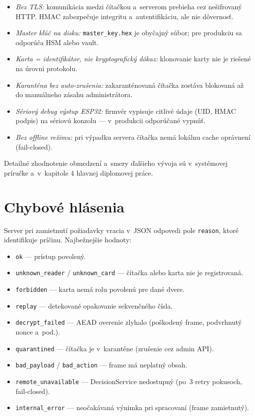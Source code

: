 \documentclass[a4paper]{feidippp}
\begin{document}
\begin{itemize}
\item \emph{Bez TLS:} komunikácia medzi čítačkou a~serverom prebieha cez nešifrovaný HTTP. HMAC zabezpečuje integritu a~autentifikáciu, ale nie dôvernosť.
\item \emph{Master kľúč na disku:} \texttt{master\_key.hex} je obyčajný súbor; pre produkciu sa odporúča HSM alebo vault.
\item \emph{Karta = identifikátor, nie kryptografický dôkaz:} klonovanie karty nie je riešené na úrovni protokolu.
\item \emph{Karanténa bez auto-zrušenia:} zakaranténovaná čítačka zostáva blokovaná až do manuálneho zásahu administrátora.
\item \emph{Sériový debug výstup ESP32:} firmvér vypisuje citlivé údaje (UID, HMAC podpis) na sériovú konzolu --- v~produkcii odporúčané vypnúť.
\item \emph{Bez offline režimu:} pri výpadku servera čítačka nemá lokálnu cache oprávnení (fail-closed).
\end{itemize}

\noindent Detailné zhodnotenie obmedzení a~smery ďalšieho vývoja sú v~systémovej príručke a~v~kapitole 4 hlavnej diplomovej práce.

\section{Chybové hlásenia}

Server pri zamietnutí požiadavky vracia v~JSON odpovedi pole \texttt{reason}, ktoré identifikuje príčinu. Najbežnejšie hodnoty:

\begin{itemize}
\item \texttt{ok} --- prístup povolený.
\item \texttt{unknown\_reader} / \texttt{unknown\_card} --- čítačka alebo karta nie je registrovaná.
\item \texttt{forbidden} --- karta nemá rolu povolenú pre dané dvere.
\item \texttt{replay} --- detekované opakovanie sekvenčného čísla.
\item \texttt{decrypt\_failed} --- AEAD overenie zlyhalo (poškodený frame, podvrhnutý nonce a~pod.).
\item \texttt{quarantined} --- čítačka je v~karanténe (zrušenie cez admin API).
\item \texttt{bad\_payload} / \texttt{bad\_action} --- frame má neplatný obsah.
\item \texttt{remote\_unavailable} --- DecisionService nedostupný (po~3 retry pokusoch, fail-closed).
\item \texttt{internal\_error} --- neočakávaná výnimka pri spracovaní (frame zamietnutý).
\end{itemize}
\end{document}
